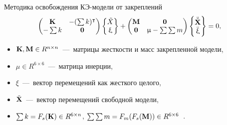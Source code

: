 \begin{frame}{Методика освобождения КЭ-модели от закреплений}
	\begin{equation} 
		\begin{pmatrix}
			\mathbf{K} & -(\sum k)^\intercal \\
			 -\sum k & \mathbf{0} 
		\end{pmatrix} 
		\begin{Bmatrix}
			\tilde{X} \\ 
			\upxi
		\end{Bmatrix}			
		+ 
		\begin{pmatrix}
			\mathbf{M} & \mathbf{0} \\
			\mathbf{0} & \upmu - \sum \sum m
		\end{pmatrix}
			\begin{Bmatrix}
			\ddot{\tilde{\mathbf{X}}} \\ 
			\ddot{\mathbf{\upxi}}
		\end{Bmatrix}	
		= 0,
	\end{equation}
	\begin{itemize}
		\item $ \mathbf{K}, \mathbf{M} \in R ^ {n \times n} $~---~матрицы жесткости и масс закрепленной модели,
		\item $ \mu \in R^{6 \times 6} $~---~матрица инерции,
		\item $ \xi $~---~вектор перемещений как жесткого целого,
		\item $ \tilde{\mathbf{X}} $~---~вектор перемещений свободной модели,
		\item $ \sum k = F_s(\mathbf{K}) \in R ^ {6 \times n}$, $ \sum \sum m = F_m(F_s(\mathbf{M})) \in R ^ {6 \times 6} $~{\footnotemark}.
	\end{itemize}
	\vfill
\end{frame}

